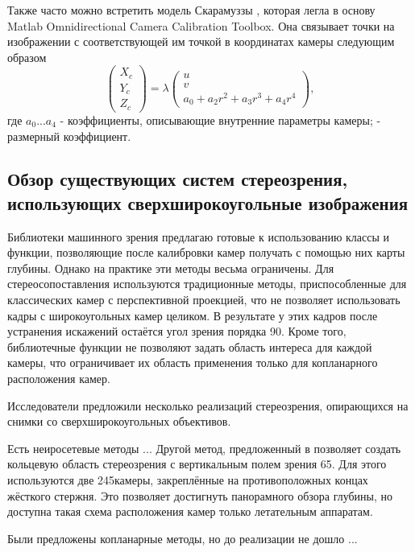 Также часто можно встретить модель Скарамуззы \cite{scaramuzza}, которая легла в основу Matlab Omnidirectional 
Camera Calibration Toolbox. Она связывает точки на изображении с соответствующей им точкой в координатах камеры 
следующим образом
\begin{equation}	
    \begin{pmatrix}X_c\\Y_c\\Z_c\end{pmatrix} = \lambda \begin{pmatrix}u\\v\\a_0 + a_2 r^2 + a_3 r^3 + a_4 r^4\end{pmatrix},
    \label{eqn:scaramuzza}
\end{equation}
где $a_0 ... a_4$ - коэффициенты, описывающие внутренние параметры камеры; \lambda - размерный коэффициент.



\subsection{Обзор существующих систем стереозрения, использующих сверхширокоугольные изображения}

Библиотеки машинного зрения предлагаю готовые к использованию классы и функции, позволяющие после калибровки
камер получать с помощью них карты глубины. Однако на практике эти методы весьма ограничены. Для стереосопоставления 
используются традиционные методы, приспособленные для классических камер с перспективной проекцией, что не позволяет 
использовать кадры с широкоугольных камер целиком. В результате у этих кадров после устранения искажений остаётся 
угол зрения порядка 90\deg. Кроме того, библиотечные функции не позволяют задать область интереса для каждой камеры, 
что ограничивает их область применения только для копланарного расположения камер. 

Исследователи предложили несколько реализаций стереозрения, опирающихся на снимки со сверхширокоугольных 
объективов.  

Есть неиросетевые методы ...
Другой метод, предложенный в \cite{omni_stereo} позволяет создать кольцевую область стереозрения с вертикальным  %
полем зрения 65\deg. Для этого используются две 245\deg камеры, закреплённые на противоположных концах жёсткого стержня.  
Это позволяет достигнуть панорамного обзора глубины, но доступна такая схема расположения камер только летательным аппаратам.  

Были предложены копланарные методы, но до реализации не дошло ...
 